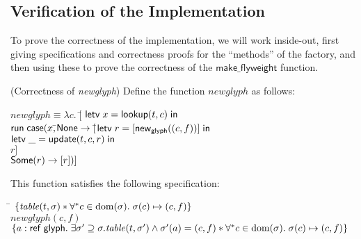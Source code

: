 \subsection{Verification of the Implementation}

To prove the correctness of the implementation, we will work
inside-out, first giving specifications and correctness proofs for the
``methods'' of the factory, and then using these to prove the correctness
of the $\mathsf{make\_flyweight}$ function. 

\begin{lemma}{(Correctness of \textit{newglyph})}
Define the function $\mathit{newglyph}$ as follows:
\begin{tabbing}
  $\mathit{newglyph} \equiv \lambda c.\; [$\=
     $\mathsf{letv}\;x = \mathsf{lookup}(t,c)\;\mathsf{in}\;$ \\
\>   $\mathsf{run}\;\mathsf{case}(x, $\=$\mathsf{None} \to [$\=$\mathsf{letv}\;r = [\mathsf{new}_{\mathsf{glyph}}((c,f))]\;\mathsf{in}\;$ \\
\>                                  \>            \>$\mathsf{letv}\;\_ = \mathsf{update}(t, c, r)\;\mathsf{in}\;$ \\
\>                                  \>            \>$r]$\\
\>                                  \>$\mathsf{Some}(r) \to [r])]$ 
\end{tabbing}
\noindent This function satisfies the following specification:
\begin{tabbing}
\;\;\=
$\{{\mathit{table}(t, \sigma) * \forall^{*}c \in \mbox{dom}({\sigma}).\;\sigma(c) \mapsto (c,f)}\}$ \\
\> $\mathit{newglyph}(c,f)$ \\
\> $\{a:\mathsf{ref}\;\mathsf{glyph}.\;
   \exists \sigma' \supseteq \sigma. \mathit{table}(t, \sigma') \land \sigma'(a) = (c,f) * \forall^{*}c \in \mbox{dom}({\sigma}).\;\sigma(c) \mapsto (c,f) \}$ \\
\end{tabbing}
\end{lemma}


